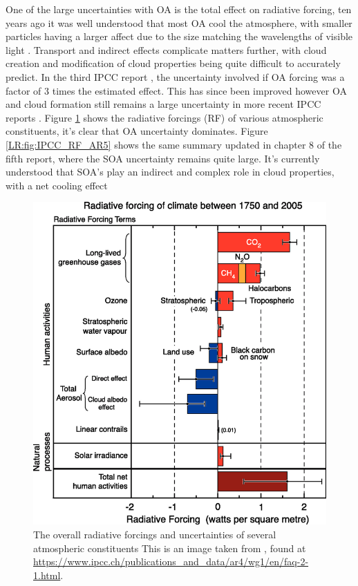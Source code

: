       One of the large uncertainties with OA is the total effect on radiative forcing, ten years ago it was well understood that most OA cool the atmosphere, with smaller particles having a larger affect due to the size matching the wavelengths of visible light \citep{Kanakidou2005}. 
      Transport and indirect effects complicate matters further, with cloud creation and modification of cloud properties being quite difficult to accurately predict.
      In the third IPCC report \citep{IPCC2001}, the uncertainty involved if OA forcing was a factor of 3 times the estimated effect. 
      This has since been improved however OA and cloud formation still remains a large uncertainty in more recent IPCC reports \citep{IPCC_Chapter2}.
      Figure \ref{LR:fig:IPCC_RF_AR4} shows the radiative forcings (RF) of various atmospheric constituents, it's clear that OA uncertainty dominates.
      Figure \ref{LR:fig:IPCC_RF_AR5} shows the same summary updated in chapter 8 of the fifth report, where the SOA uncertainty remains quite large.
      It's currently understood that SOA's play an indirect and complex role in cloud properties, with a net cooling effect \citep[Chapter 7,8]{IPCC_AR5_WG1}
      
      \begin{figure}
        \includegraphics[width=\textwidth]{Figures/IPCC_WG1AR4_RFSummary.png}
        \caption{%
          The overall radiative forcings and uncertainties of several atmospheric constituents
  	      This is an image taken from \cite{IPCC_Chapter2}, found at \url{https://www.ipcc.ch/publications_and_data/ar4/wg1/en/faq-2-1.html}.}
        \label{LR:fig:IPCC_RF_AR4}
      \end{figure}
  
